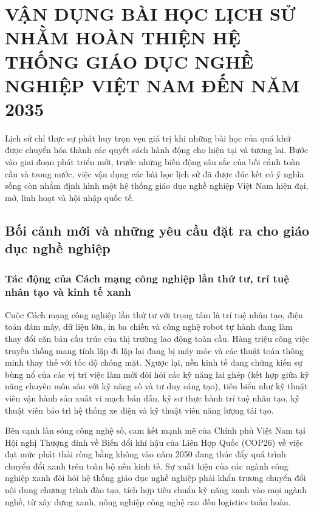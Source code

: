 \section{VẬN DỤNG BÀI HỌC LỊCH SỬ NHẰM HOÀN THIỆN HỆ THỐNG GIÁO DỤC NGHỀ NGHIỆP VIỆT NAM ĐẾN NĂM 2035}

Lịch sử chỉ thực sự phát huy trọn vẹn giá trị khi những bài học của quá khứ được chuyển hóa thành các quyết sách hành động cho hiện tại và tương lai. Bước vào giai đoạn phát triển mới, trước những biến động sâu sắc của bối cảnh toàn cầu và trong nước, việc vận dụng các bài học lịch sử đã được đúc kết có ý nghĩa sống còn nhằm định hình một hệ thống giáo dục nghề nghiệp Việt Nam hiện đại, mở, linh hoạt và hội nhập quốc tế.

\subsection{Bối cảnh mới và những yêu cầu đặt ra cho giáo dục nghề nghiệp}

\subsubsection{Tác động của Cách mạng công nghiệp lần thứ tư, trí tuệ nhân tạo và kinh tế xanh}

Cuộc Cách mạng công nghiệp lần thứ tư với trọng tâm là trí tuệ nhân tạo, điện toán đám mây, dữ liệu lớn, in ba chiều và công nghệ robot tự hành đang làm thay đổi căn bản cấu trúc của thị trường lao động toàn cầu. Hàng triệu công việc truyền thống mang tính lặp đi lặp lại đang bị máy móc và các thuật toán thông minh thay thế với tốc độ chóng mặt. Ngược lại, nền kinh tế đang chứng kiến sự bùng nổ của các vị trí việc làm mới đòi hỏi các kỹ năng lai ghép (kết hợp giữa kỹ năng chuyên môn sâu với kỹ năng số và tư duy sáng tạo), tiêu biểu như kỹ thuật viên vận hành sản xuất vi mạch bán dẫn, kỹ sư thực hành trí tuệ nhân tạo, kỹ thuật viên bảo trì hệ thống xe điện và kỹ thuật viên năng lượng tái tạo.

Bên cạnh làn sóng công nghệ số, cam kết mạnh mẽ của Chính phủ Việt Nam tại Hội nghị Thượng đỉnh về Biến đổi khí hậu của Liên Hợp Quốc (COP26) về việc đạt mức phát thải ròng bằng không vào năm 2050 đang thúc đẩy quá trình chuyển đổi xanh trên toàn bộ nền kinh tế. Sự xuất hiện của các ngành công nghiệp xanh đòi hỏi hệ thống giáo dục nghề nghiệp phải khẩn trương chuyển đổi nội dung chương trình đào tạo, tích hợp tiêu chuẩn kỹ năng xanh vào mọi ngành nghề, từ xây dựng xanh, nông nghiệp công nghệ cao đến logistics tuần hoàn.

